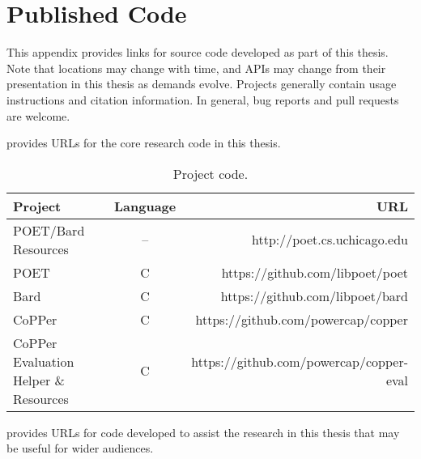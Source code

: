 \chapter{Published Code}
\label{app:urls}

This appendix provides links for source code developed as part of this thesis.
Note that locations may change with time, and APIs may change from their presentation in this thesis as demands evolve.
Projects generally contain usage instructions and citation information.
In general, bug reports and pull requests are welcome.

 provides URLs for the core research code in this thesis.

\begin{table}[ht]
\scriptsize
\centering
\caption{Project code.}
\begin{tabular}{lcr}
  \textbf{Project} & \textbf{Language} & \textbf{URL} \\
  \hline
  \hline
  POET/Bard Resources & -- & http://poet.cs.uchicago.edu \\
  POET & C & https://github.com/libpoet/poet \\
  Bard & C & https://github.com/libpoet/bard \\
  \hline
  CoPPer & C & https://github.com/powercap/copper \\
  CoPPer Evaluation Helper \& Resources & C & https://github.com/powercap/copper-eval \\
  \hline
  \hline
\end{tabular}
\label{tbl:project-code}
\end{table}


 provides URLs for code developed to assist the research in this thesis that may be useful for wider audiences.

